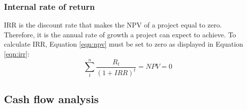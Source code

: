 \subsubsection{Internal rate of return}
IRR is the discount rate that makes the NPV of a project equal to zero. Therefore, it is the annual rate of growth a project can expect to achieve. To calculate IRR, Equation \ref{eqn:npv} must be set to zero as displayed in Equation \ref{eqn:irr}:
\begin{equation}
\label{eqn:irr}
    \sum_t^n\frac{R_{t}}{(1+IRR)^{t}}=NPV=0
\end{equation}

\subsection{Cash flow analysis}
